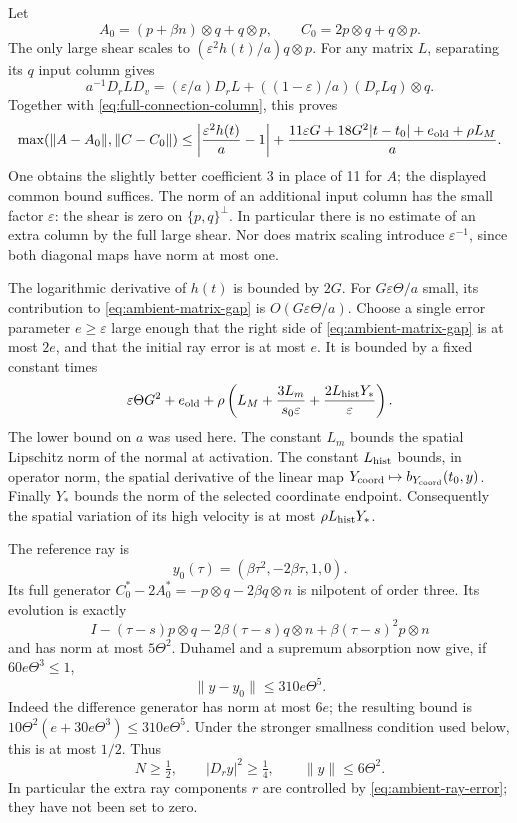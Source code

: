 Let
\[
 A_0=(p+\beta n)\otimes q+q\otimes p,\qquad
 C_0=2p\otimes q+q\otimes p .
\]
The only large shear scales to
$(\varepsilon^2h(t)/a)q\otimes p$.
For any matrix $L$, separating its $q$ input column gives
\[
 a^{-1}D_rLD_v
 =(\varepsilon/a)D_rL+
          ((1-\varepsilon)/a)(D_rLq)\otimes q.
\]
Together with \eqref{eq:full-connection-column}, this proves
\begin{equation}\label{eq:ambient-matrix-gap}
 \max(\|A-A_0\|,\|C-C_0\|)
 \leq \left|\frac{\varepsilon^2h(t)}a-1\right|
 +\frac{11\varepsilon G+18G^2|t-t_0|+
                    e_{\rm old}+\rho L_M}{a}.
\end{equation}
One obtains the slightly better coefficient 3 in place of 11 for $A$;
the displayed common bound suffices. The norm of an additional input
column has the small factor $\varepsilon$: the shear is zero on
$\{p,q\}^\perp$. In particular there is no estimate of an extra column
by the full large shear. Nor does matrix scaling introduce
$\varepsilon^{-1}$, since both diagonal maps have norm at most one.

The logarithmic derivative of $h(t)$ is bounded by $2G$.
For $G\varepsilon\Theta/a$ small, its contribution to
\eqref{eq:ambient-matrix-gap} is $O(G\varepsilon\Theta/a)$.
Choose a single error parameter $e\geq\varepsilon$ large enough that
the right side of \eqref{eq:ambient-matrix-gap} is at most $2e$,
and that the initial ray error is at most $e$.
It is bounded by a fixed constant times
\begin{equation}\label{eq:ambient-error-input}
 \varepsilon\Theta G^2+
 e_{\rm old}+
 \rho\left(L_M+\frac{3L_m}{s_0\varepsilon}
          +\frac{2L_{\rm hist}Y_*}{\varepsilon}\right).
\end{equation}
The lower bound on $a$ was used here. The constant $L_m$ bounds the
spatial Lipschitz norm of the normal at activation. The constant
$L_{\rm hist}$ bounds, in operator norm, the spatial derivative of the
linear map $Y_{\rm coord}\mapsto b_{Y_{\rm coord}}(t_0,y)$.
Finally $Y_*$ bounds the norm of the selected coordinate endpoint.
Consequently the spatial variation of its high velocity is at most
$\rho L_{\rm hist}Y_*$.

The reference ray is
\[
 y_0(\tau)=(\beta\tau^2,-2\beta\tau,1,0).
\]
Its full generator $C_0^*-2A_0^*=-p\otimes q-2\beta q\otimes n$
is nilpotent of order three. Its evolution is exactly
\[
 I-(\tau-s)p\otimes q-2\beta(\tau-s)q\otimes n+
                  \beta(\tau-s)^2p\otimes n
\]
and has norm at most $5\Theta^2$.
Duhamel and a supremum absorption now give, if
$60e\Theta^3\leq1$,
\begin{equation}\label{eq:ambient-ray-error}
 \|y-y_0\|\leq310e\Theta^5.
\end{equation}
Indeed the difference generator has norm at most $6e$; the resulting
bound is
$10\Theta^2(e+30e\Theta^3)\leq310e\Theta^5$.
Under the stronger smallness condition used below, this is at most
$1/2$. Thus
\[
 N\geq\tfrac12,\qquad |D_ry|^2\geq\tfrac14,\qquad
 \|y\|\leq6\Theta^2.
\]
In particular the extra ray components $r$ are controlled by
\eqref{eq:ambient-ray-error}; they have not been set to zero.

